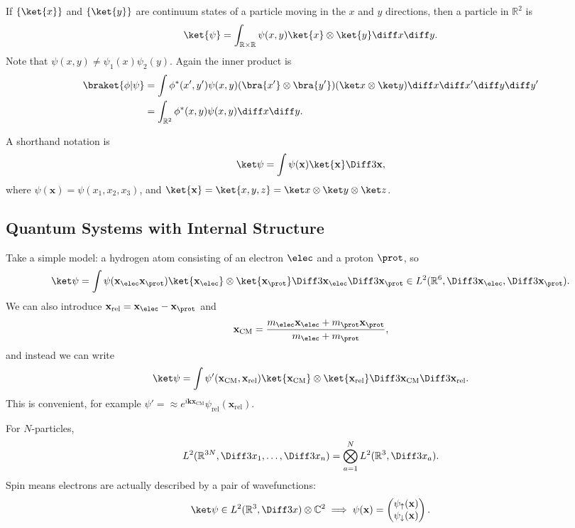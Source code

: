 \documentclass[12pt]{article}
\begin{document}
\begin{exbox}
	If $\{\ket{x}\}$ and $\{\ket{y}\}$ are continuum states of a particle moving in the $x$ and $y$ directions, then a particle in $\mathbb{R}^2$ is
	\[
		\ket{\psi} = \int_{\mathbb{R} \times \mathbb{R}} \psi(x, y) \ket{x} \otimes \ket{y} \diff x \diff y.
	\]
	Note that $\psi(x, y) \neq \psi_1(x)\psi_2(y)$. Again the inner product is
	\begin{align*}
	\braket{\phi|\psi} &= \int \phi^{\ast}(x', y') \psi(x, y) (\bra{x'} \otimes \bra{y'})(\ket x \otimes \ket y) \diff x \diff x' \diff y \diff y' \\
			   &= \int_{\mathbb{R}^2} \phi^{\ast}(x, y) \psi(x, y) \diff x \diff y.
	\end{align*}
\end{exbox}

A shorthand notation is
\[
	\ket \psi = \int \psi(\mathbf{x}) \ket{\mathbf{x}} \Diff3 \mathbf{x},
\]
where $\psi(\mathbf{x}) = \psi(x_1, x_2, x_3)$, and $\ket{\mathbf{x}} = \ket{x, y, z} = \ket x \otimes \ket y \otimes \ket z$.

\subsection{Quantum Systems with Internal Structure}
\label{sub:internal_structure}

Take a simple model: a hydrogen atom consisting of an electron $\elec$ and a proton $\prot$, so
\[
	\ket \psi = \int \psi (\mathbf{x}_{\elec} \mathbf{x}_{\prot}) \ket{\mathbf{x}_{\elec}} \otimes \ket{\mathbf{x}_{\prot}} \Diff3 \mathbf{x}_{\elec} \Diff3 \mathbf{x}_{\prot} \in L^2(\mathbb{R}^{6}, \Diff3\mathbf{x}_{\elec}, \Diff3\mathbf{x}_{\prot}).
\]
We can also introduce $\mathbf{x}_{\mathrm{rel}} = \mathbf{x}_{\elec} - \mathbf{x}_{\prot}$ and
\[
\mathbf{x}_{\mathrm{CM}} = \frac{m_{\elec} \mathbf{x}_{\elec} + m_{\prot} \mathbf{x}_{\prot} }{m_{\elec} + m_{\prot}},
\]
and instead we can write
\[
	\ket \psi = \int \psi'(\mathbf{x}_{\mathrm{CM}}, \mathbf{x}_{\mathrm{rel}}) \ket{\mathbf{x}_{\mathrm{CM}}} \otimes \ket{\mathbf{x}_{\mathrm{rel}}} \Diff3 \mathbf{x}_{\mathrm{CM}} \Diff3 \mathbf{x}_{\mathrm{rel}}.
\]
This is convenient, for example $\psi' = \approx e^{i \mathbf{k} \mathbf{x}_{\mathrm{CM}}} \psi_{\mathrm{rel}}(\mathbf{x}_{\mathrm{rel}})$.

For $N$-particles,
\[
L^2(\mathbb{R}^{3N},\Diff3 x_1, \ldots, \Diff3 x_n) = \bigotimes_{a = 1}^{N} L^2(\mathbb{R}^3, \Diff3 x_a).
\]
Spin means electrons are actually described by a pair of wavefunctions:
\[
\ket \psi \in L^2(\mathbb{R}^3, \Diff3 x) \otimes \mathbb{C}^2 \implies \psi(\mathbf{x}) =
\begin{pmatrix}
	\psi_{\uparrow}(\mathbf{x})\\ \psi_{\downarrow}(\mathbf{x})
\end{pmatrix}.
\]
\end{document}
